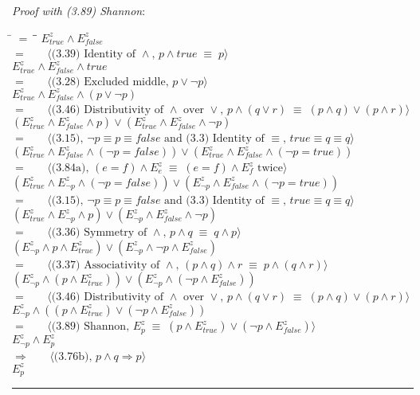 \documentclass[12pt, fleqn, leqno]{article}
\newcommand{\lgap}{2pt}                             %
\newcommand{\mymathindent}{24pt}                    %
\newcommand{\equivs}{\ensuremath{\;\equiv\;}}       %
\newcommand{\impl}{\ensuremath{\Rightarrow}}        %
\newcommand{\myqed}{\rule[-.23ex]{1.2ex}{2.0ex}}
\newcommand{\myqedtab}{\hspace{384pt}}              %
\newcommand{\Gll} {\langle}                         %
\newcommand{\Ggg} {\rangle}                         %
\newcommand{\Hint}[1]     {\ \ \ $\Gll              \mbox{#1} \Ggg$ }   %
\begin{document}
\textit{Proof with (3.89) Shannon}:
\begin{tabbing}
\hspace{\mymathindent} \= $= \;$ \= \myqedtab \= \kill
	\> \>  $E^{z}_{true}\land E^{z}_{false}$\\
	\> $=$  \>  \Hint{(3.39) Identity of $\land$, $p \land true \equivs p$}\\[\lgap]
	\> \>   $E^{z}_{true}\land E^{z}_{false}\land {true}$\\
	\> $=$  \>  \Hint{(3.28) Excluded middle, $p \lor \lnot p$}\\[\lgap]
	\> \>   $E^{z}_{true}\land E^{z}_{false}\land(p\lor\lnot p)$\\
	\> $=$  \>  \Hint{(3.46) Distributivity of $\land$ over $\lor$, $p \land (q \lor r) \equivs (p \land q) \lor (p \land r)$}\\[\lgap]
	\> \>   $(E^{z}_{true}\land E^{z}_{false}\land p)\lor(E^{z}_{true}\land E^{z}_{false}\land\lnot p)$\\
	\> $=$  \>  \Hint{(3.15), $\lnot p \equiv p \equiv false$ and (3.3) Identity of $\equiv$, $true \equiv q \equiv q$}\\[\lgap]
	\> \>   $(E^{z}_{true}\land E^{z}_{false}\land (\lnot p=false))\lor(E^{z}_{true}\land E^{z}_{false}\land (\lnot p=true))$\\
	\> $=$  \>  \Hint{(3.84a), $(e = f) \land E^{z}_{e} \equivs (e = f) \land E^{z}_{f}$ twice}\\[\lgap]
	\> \>   $(E^{z}_{true}\land E^{z}_{\lnot p}\land (\lnot p=false))\lor(E^{z}_{\lnot p}\land E^{z}_{false}\land (\lnot p=true))$\\
	\> $=$  \>  \Hint{(3.15), $\lnot p \equiv p \equiv false$ and (3.3) Identity of $\equiv$, $true \equiv q \equiv q$}\\[\lgap]
	\> \>   $(E^{z}_{true}\land E^{z}_{\lnot p}\land p)\lor(E^{z}_{\lnot p}\land E^{z}_{false}\land \lnot p)$\\
	\> $=$  \>  \Hint{(3.36) Symmetry of $\land$, $p \land q \equivs q \land p$}\\[\lgap]
	\> \>  $(E^{z}_{\lnot p}\land p\land E^{z}_{true})\lor(E^{z}_{\lnot p}\land \lnot p\land E^{z}_{false})$\\
	\> $=$  \>  \Hint{(3.37) Associativity of $\land$, $(p \land q) \land r \equivs p \land (q \land r)$}\\[\lgap]
	\> \>  $(E^{z}_{\lnot p}\land (p\land E^{z}_{true}))\lor(E^{z}_{\lnot p}\land (\lnot p\land E^{z}_{false}))$\\
	\> $=$  \>  \Hint{(3.46) Distributivity of $\land$ over $\lor$, $p \land (q \lor r) \equivs (p \land q) \lor (p \land r)$}\\[\lgap]
	\> \>   $E^{z}_{\lnot p}\land ((p\land E^{z}_{true})\lor (\lnot p\land E^{z}_{false}))$\\
	\> $=$  \>  \Hint{(3.89) Shannon, $E^{z}_{p} \equivs (p \land E^{z}_{true}) \lor (\lnot p \land E^{z}_{false})$}\\[\lgap]
	\> \>   $E^{z}_{\lnot p}\land E^{z}_{p}$\\
	\> $\impl$  \>  \Hint{(3.76b), $p \land q \impl p$}\\[\lgap]
	\> \>   $E^{z}_{p}$ \quad \myqed\\
\end{tabbing}
\end{document}
